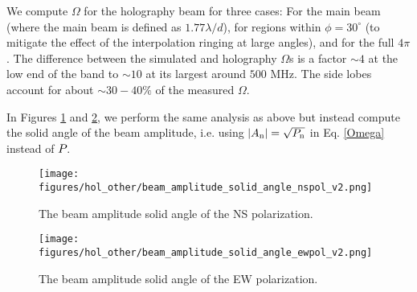 We compute $\Omega$ for the holography beam for three cases: For the main beam (where the main beam is defined as $1.77\lambda/d$),  for regions within $\phi = 30^\circ$ (to mitigate the effect of the interpolation ringing at large angles), and for the full $4\pi$. The difference between the simulated and holography $\Omega$s is a factor $\sim 4$ at the low end of the band to $\sim 10$ at its largest around $500$ MHz.  The side lobes account for about $\sim 30-40\%$ of the measured $\Omega$.

In Figures \ref{basans} and \ref{basaew}, we perform the same analysis as above but instead compute the solid angle of the beam amplitude, i.e. using $|A_{\rm n}| =  \sqrt{P_{\rm n}}$ in Eq. \ref{Omega} instead of $P_{\rm}$.

\begin{figure}[h!]
\begin{center}
\texttt{[image: figures/hol\_other/beam\_amplitude\_solid\_angle\_nspol\_v2.png]}
\caption{The beam amplitude solid angle of the NS polarization. \label{basans}}
\end{center}
\end{figure}

\begin{figure}[h!]
\begin{center}
\texttt{[image: figures/hol\_other/beam\_amplitude\_solid\_angle\_ewpol\_v2.png]}
\caption{The beam amplitude solid angle of the EW polarization. \label{basaew}}
\end{center}
\end{figure}
